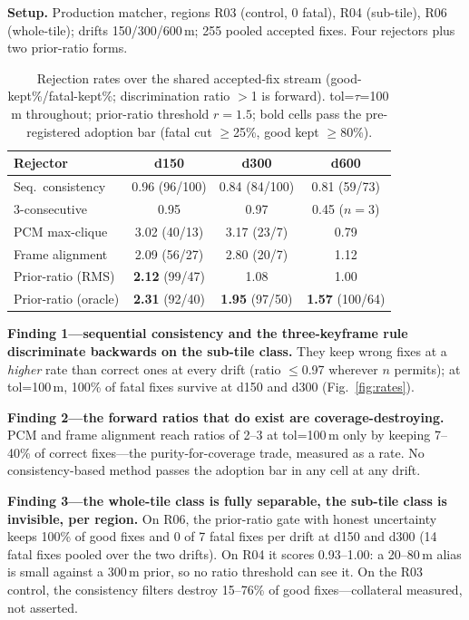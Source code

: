 \documentclass[journal]{IEEEtran}
\begin{document}
\textbf{Setup.} Production matcher, regions R03 (control, 0 fatal), R04 (sub-tile), R06 (whole-tile); drifts 150/300/600\,m; 255 pooled accepted fixes. Four rejectors plus two prior-ratio forms.

\begin{table}[t]
\caption{Rejection rates over the shared accepted-fix stream (good-kept\%/fatal-kept\%; discrimination ratio $>$1 is forward). tol=$\tau$=100\,m throughout; prior-ratio threshold $r{=}1.5$; bold cells pass the pre-registered adoption bar (fatal cut $\geq$25\%, good kept $\geq$80\%).}
\label{tab:rates}
\centering
\footnotesize
\begin{tabular}{@{}lccc@{}}
\toprule
Rejector & d150 & d300 & d600 \\
\midrule
Seq.\ consistency & 0.96 (96/100) & 0.84 (84/100) & 0.81 (59/73) \\
3-consecutive & 0.95 & 0.97 & 0.45 ($n{=}3$) \\
PCM max-clique & 3.02 (40/13) & 3.17 (23/7) & 0.79 \\
Frame alignment & 2.09 (56/27) & 2.80 (20/7) & 1.12 \\
Prior-ratio (RMS) & \textbf{2.12} (99/47) & 1.08 & 1.00 \\
Prior-ratio (oracle) & \textbf{2.31} (92/40) & \textbf{1.95} (97/50) & \textbf{1.57} (100/64) \\
\bottomrule
\end{tabular}
\end{table}

\textbf{Finding 1---sequential consistency and the three-keyframe rule discriminate backwards on the sub-tile class.} They keep wrong fixes at a \emph{higher} rate than correct ones at every drift (ratio $\leq$0.97 wherever $n$ permits); at tol=100\,m, 100\% of fatal fixes survive at d150 and d300 (Fig.~\ref{fig:rates}).

\textbf{Finding 2---the forward ratios that do exist are coverage-destroying.} PCM and frame alignment reach ratios of 2--3 at tol=100\,m only by keeping 7--40\% of correct fixes---the purity-for-coverage trade, measured as a rate. No consistency-based method passes the adoption bar in any cell at any drift.

\textbf{Finding 3---the whole-tile class is fully separable, the sub-tile class is invisible, per region.} On R06, the prior-ratio gate with honest uncertainty keeps 100\% of good fixes and 0 of 7 fatal fixes per drift at d150 and d300 (14 fatal fixes pooled over the two drifts). On R04 it scores 0.93--1.00: a 20--80\,m alias is small against a 300\,m prior, so no ratio threshold can see it. On the R03 control, the consistency filters destroy 15--76\% of good fixes---collateral measured, not asserted.
\end{document}
